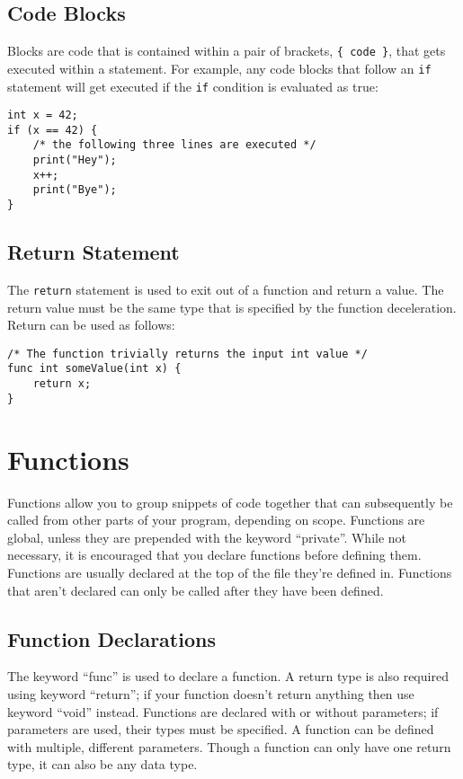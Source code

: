 \documentclass{article}
\begin{document}
\subsection{Code Blocks}
Blocks are code that is contained within a pair of brackets, \texttt{\{ code \}}, that gets executed within a statement.  For example, any code blocks that follow an \texttt{if} statement will get executed if the \texttt{if} condition is evaluated as true:

\begin{lstlisting}
int x = 42;
if (x == 42) {
	/* the following three lines are executed */
	print("Hey");
	x++;
	print("Bye");
}
\end{lstlisting}

\subsection{Return Statement}
The \texttt{return} statement is used to exit out of a function and return a value.  The return value must be the same type that is specified by the function deceleration.  Return can be used as follows:

\begin{lstlisting}
/* The function trivially returns the input int value */
func int someValue(int x) {
	return x;
}
\end{lstlisting}

\section{Functions}
Functions allow you to group snippets of code together that can subsequently be called from other parts of your program, depending on scope. Functions are global, unless they are prepended with the keyword ``private''. While not necessary, it is encouraged that you declare functions before defining them. Functions are usually declared at the top of the file they're defined in. Functions that aren't declared can only be called after they have been defined. 

\subsection{Function Declarations}

The keyword ``func'' is used to declare a function. A return type is also required using keyword ``return''; if your function doesn't return anything then use keyword ``void'' instead.  Functions are declared with or without parameters; if parameters are used, their types must be specified. A function can be defined with multiple, different parameters. Though a function can only have one return type, it can also be any data type. 
\end{document}
